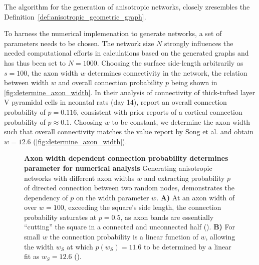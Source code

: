 The algorithm for the generation of anisotropic networks, closely
zresembles the Definition~\ref{def:anisotropic_geometric_graph}. 


To harness the numerical implemenation to generate networks, a set of
parameters needs to be chosen. The network size $N$ strongly
influences
the needed computational efforts in calculations based on the
generated graphs and has thus been set to $N = 1000$. Choosing the
surface side-length arbitrarily as $s=100$, the axon width $w$
determines connectivity in the network, the relation between width $w$
and overall connection probability $p$ being shown in
\autoref{fig:determine_axon_width}. In their analysis of connectivity
of thick-tufted layer V pyramidal cells in neonatal rats (day 14),
\textcite{Song2005} report an overall connection probability of
$p=0.116$, consistent with prior reports of a cortical connection
probability of $p \approx 0.1$. Choosing $w$ to be constant, we
determine the axon width such that overall connectivity matches the
value report by Song et al. and obtain $w = 12.6$
(\autoref{fig:determine_axon_width}).

\begin{figure}[!htbp]
  \centering
  \vspace{-0.15cm}
  \caption{\textbf{Axon width dependent connection probability
      determines parameter for numerical analysis} Generating
    anisotropic networks with different axon widths $w$ and extracting
    probability $p$ of directed connection between two random nodes,
    demonstrates the dependency of $p$ on the width parameter $w$.
    \textbf{A)} At an axon width of over $w=100$, exceeding the
    square's side length, the connection probability saturates at
    $p=0.5$, as axon bands are essentially \enquote{cutting} the
    square in a connected and unconnected half
    (). \textbf{B)} For small $w$ the connection
    probability is a linear function of $w$, allowing the width $w_S$
    at which $p(w_S)=11.6$ to be determined by a linear fit as $w_S =
    12.6$ ().}
  \label{fig:determine_axon_width}
\end{figure}



